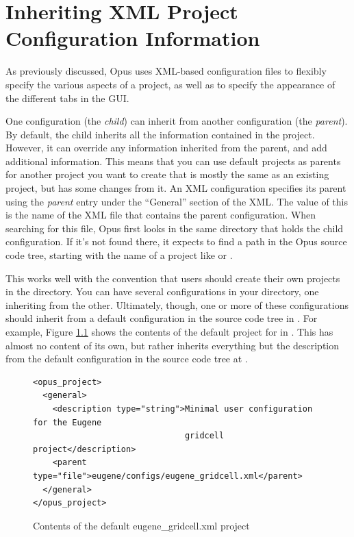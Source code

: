 \chapter{Inheriting XML Project Configuration Information}
\label{chapter:xml-inheritance}

As previously discussed, Opus uses XML-based configuration files to
flexibly specify the various aspects of a project, as well as to specify the
appearance of the different tabs in the GUI\@.

One configuration (the \emph{child}) can inherit from another configuration
(the \emph{parent}).  By default, the child inherits all the information
contained in the project.  However, it can override any information
inherited from the parent, and add additional information.  This means that
you can use default projects as parents for another project you want to
create that is mostly the same as an existing project, but has some changes
from it.  An XML configuration specifies its parent using the \emph{parent}
entry under the ``General'' section of the XML\@.  The value of this is the
name of the XML file that contains the parent configuration.  When
searching for this file, Opus first looks in the same directory that holds
the child configuration.  If it's not found there, it expects to find a
path in the Opus source code tree, starting with the name of a project like
 or .

This works well with the convention that users should create their own
projects in the  directory.  You can have
several configurations in your  directory, one
inheriting from the other.  Ultimately, though, one or more of these
configurations should inherit from a default configuration in the source
code tree in .  For example, Figure
\ref{fig:eugene-gridcell-xml-default} shows the contents of the default
project for  in .  This
has almost no content of its own, but rather inherits everything but the
description from the default configuration in the source code tree at
.

\begin{figure}[htp]
\begin{center}
\begin{verbatim}
<opus_project>
  <general>
    <description type="string">Minimal user configuration for the Eugene 
                               gridcell project</description>
    <parent type="file">eugene/configs/eugene_gridcell.xml</parent>
  </general>
</opus_project>
\end{verbatim}
\end{center}
\caption{Contents of the default eugene\_gridcell.xml project}
\label{fig:eugene-gridcell-xml-default}
\end{figure}

